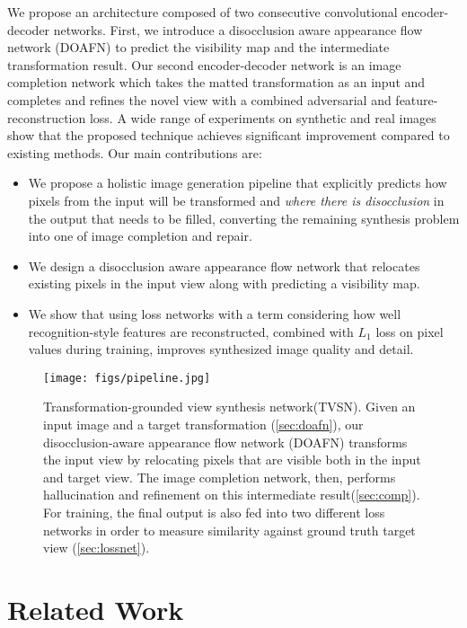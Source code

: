 \documentclass[10pt,twocolumn,letterpaper]{article}
\begin{document}
We propose an architecture composed of two consecutive convolutional encoder-decoder networks. First, we introduce a disocclusion aware appearance flow network (DOAFN) to predict the visibility map and the intermediate transformation result. Our second encoder-decoder network is an image completion network which takes the matted transformation as an input and completes and refines the novel view with a combined adversarial and feature-reconstruction loss. A wide range of experiments on synthetic and real images show that the proposed technique achieves significant improvement compared to existing methods.
%
Our main contributions are:
\begin{itemize}
\item We propose a holistic image generation pipeline that explicitly predicts how pixels from the input will be transformed and {\em where there is disocclusion} in the output that needs to be filled, converting the remaining synthesis problem into one of image completion and repair.
\item We design a disocclusion aware appearance flow network that relocates existing pixels in the input view along with predicting a visibility map.  
\item We show that using loss networks with a term considering how well recognition-style features are reconstructed, combined with $L_1$ loss on pixel values during training, improves synthesized image quality and detail.
\end{itemize}

\begin{figure*}[t]
\begin{center}
\texttt{[image: figs/pipeline.jpg]}
\end{center}
\caption{Transformation-grounded view synthesis network(TVSN). Given an input image and a target transformation (\ref{sec:doafn}), our disocclusion-aware appearance flow network (DOAFN) transforms the input view by relocating pixels that are visible both in the input and target view. The image completion network, then, performs hallucination and refinement on this intermediate result(\ref{sec:comp}). For training, the final output is also fed into two different loss networks in order to measure similarity against ground truth target view (\ref{sec:lossnet}). }
\label{fig:pipeline}
\end{figure*}


\vspace{-1mm}
\vspace{-1mm}
\section{Related Work}
\end{document}
